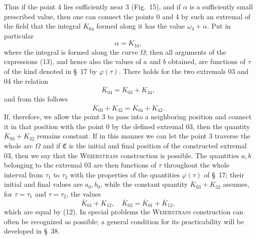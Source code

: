 \documentclass[11pt,a4paper,leqno]{article}
\begin{document}
Thus if the point 4 lies sufficiently near 3 (Fig.~15), and if $\alpha$ is a sufficiently small prescribed value, then one can connect the points 0 and 4 by such an extremal of the field that the integral $\overline{K}_{04}$ formed along it has the value $\omega_3+\alpha$. Put in particular
\[
\alpha=K_{34},
\]
where the integral is formed along the curve $\Omega$; then all arguments of the expressions (13), and hence also the values of $a$ and $b$ obtained, are functions of $\tau$ of the kind denoted in \S~17 by $\varphi(\tau)$. There holds for the two extremals 03 and 04 the relation
\[
\overline{K}_{04}=\overline{K}_{03}+K_{34},
\]
and from this follows
\[
\overline{K}_{03}+K_{32}=\overline{K}_{04}+K_{42}.
\]
If, therefore, we allow the point 3 to pass into a neighboring position and connect it in that position with the point 0 by the defined extremal 03, then the quantity $\overline{K}_{03}+K_{32}$ remains constant. If in this manner we can let the point 3 traverse the whole arc $\Omega$
and if $\mathfrak{C}$ is the initial and final position of the constructed extremal 03, then we say that the \textsc{Weierstrass} construction is possible. The quantities $a,b$ belonging to the extremal 03 are then functions of $\tau$ throughout the whole interval from $\tau_1$ to $\tau_2$ with the properties of the quantities $\varphi(\tau)$ of \S~17; their initial and final values are $a_0,b_0$, while the constant quantity $\overline{K}_{03}+K_{32}$ assumes, for $\tau=\tau_1$ and $\tau=\tau_2$, the values
\[
\overline{K}_{01}+K_{12},
\quad
\overline{K}_{02}=\overline{K}_{01}+\overline{K}_{12},
\]
which are equal by (12). In special problems the \textsc{Weierstrass} construction can often be recognized as possible; a general condition for its practicability will be developed in \S~38.
\end{document}
